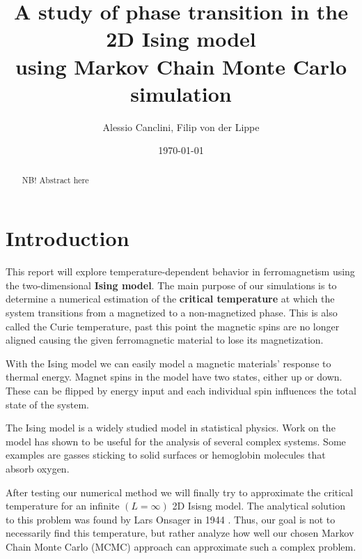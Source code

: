 \documentclass[english,notitlepage,reprint,nofootinbib]{revtex4-1}  %
\begin{document}
\title{A study of phase transition in the 2D Ising model\\using Markov Chain Monte Carlo simulation}  %
\author{Alessio Canclini, Filip von der Lippe} %
\date{\today}                             %
\noaffiliation                            %

\begin{abstract}
    NB! Abstract here
\end{abstract}
\maketitle


\section{Introduction}
This report will explore temperature-dependent behavior in ferromagnetism using the two-dimensional \textbf{Ising model}. The main purpose of our simulations is to determine a numerical estimation of the \textbf{critical temperature} at which the system transitions from a magnetized to a non-magnetized phase. This is also called the Curie temperature, past this point the magnetic spins are no longer aligned causing the given ferromagnetic material to lose its magnetization. 

With the Ising model we can easily model a magnetic materials' response to thermal energy. Magnet spins in the model have two states, either up or down. These can be flipped by energy input and each individual spin influences the total state of the system.

The Ising model is a widely studied model in statistical physics. Work on the model has shown to be useful for the analysis of several complex systems. Some examples are gasses sticking to solid surfaces or hemoglobin molecules that absorb oxygen.\cite{compendium}

After testing our numerical method we will finally try to approximate the critical temperature for an infinite $(L=\infty)$ 2D Isisng model. The analytical solution to this problem was found by Lars Onsager in 1944 \cite{project}. Thus, our goal is not to necessarily find this temperature, but rather analyze how well our chosen Markov Chain Monte Carlo (MCMC) approach can approximate such a complex problem.
\end{document}
